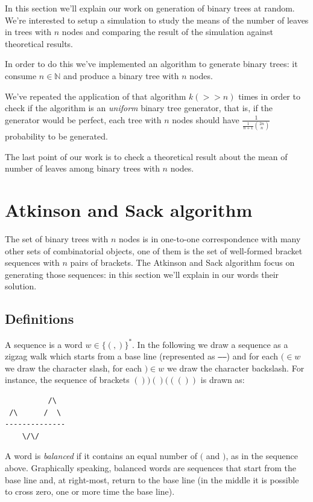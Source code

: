 In this section we'll explain our work on generation of binary trees
at random. We're interested to setup a simulation to study the means
of the number of leaves in trees with $n$ nodes and comparing the
result of the simulation against theoretical results.

In order to do this we've implemented an algorithm to generate binary
trees: it consume $n \in \mathbb{N} $ and produce a binary tree with
$n$ nodes.

We've repeated the application of that algorithm $k (>>
n)$ times in order to check if the algorithm is an \emph{uniform}
binary tree generator, that is, if the generator would be perfect,
each tree with $n$ nodes should have $ \frac{1}{
  \frac{1}{n+1}{{2n}\choose{n}} } $ probability to be generated.

The last point of our work is to check a theoretical result about the
mean of number of leaves among binary trees with $n$ nodes.


\section{Atkinson and Sack algorithm}
The set of binary trees with $n$ nodes is in one-to-one correspondence
with many other sets of combinatorial objects, one of them is the set
of well-formed bracket sequences with $n$ pairs of brackets. The
Atkinson and Sack algorithm focus on generating those sequences: in
this section we'll explain in our words their solution.

\subsection{Definitions}

A sequence is a word $w \in \{(,)\}^*$. In the following we draw a
sequence as a zigzag walk which starts from a base line (represented
as \texttt{-----}) and for each $( \in w$ we draw the character
slash, for each $) \in w$ we draw the character backslash. For
instance, the sequence of brackets $())()((())$ is drawn as:
\begin{verbatim}
          /\
 /\      /  \
--------------
    \/\/ 
\end{verbatim}
A word is \emph{balanced} if it contains an equal number of $($ and
$)$, as in the sequence above. Graphically speaking, balanced words
are sequences that start from the base line and, at right-most, return
to the base line (in the middle it is possible to cross zero, one or
more time the base line).\\

